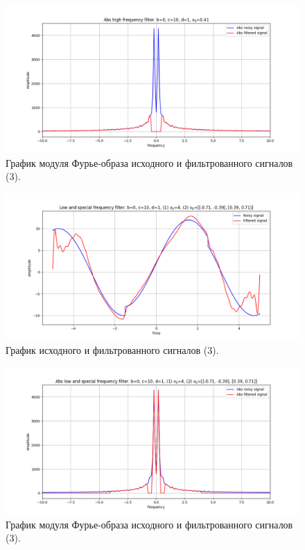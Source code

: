 \documentclass[a4paper, 12pt]{article}
\begin{document}
    \begin{figure}[!htb]
        \centering
        \includegraphics[scale=0.48]{3_2_abs_u_U_nospec.png}
        \captionsetup{skip=0pt}
        \caption{График модуля Фурье-образа исходного и фильтрованного сигналов (3).}
        \label{fig:fig96}
    \end{figure}
    \begin{figure}[!htb]
        \centering
        \includegraphics[scale=0.48]{3_3_u_flt_u_nospec.png}
        \captionsetup{skip=0pt}
        \caption{График исходного и фильтрованного сигналов (3).}
        \label{fig:fig97}
    \end{figure}
    \begin{figure}[!htb]
        \centering
        \includegraphics[scale=0.48]{3_3_abs_u_U_nospec.png}
        \captionsetup{skip=0pt}
        \caption{График модуля Фурье-образа исходного и фильтрованного сигналов (3).}
        \label{fig:fig98}
    \end{figure}
\end{document}
